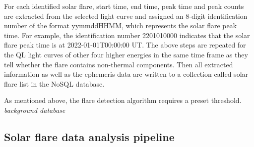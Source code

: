 \documentclass[referee]{aa} %
\begin{document}
For each identified solar flare,  start time, end time, peak time and peak 
counts are extracted from the selected light curve and assigned 
an 8-digit identification number of the format yymmddHHMM, which represents the solar flare peak time. 
For example, the identification number 2201010000  indicates that 
the solar flare peak time is at 2022-01-01T00:00:00 UT. 
The above steps are repeated  for the QL light curves of other four higher energies in the same time frame as they tell whether the flare 
contains non-thermal components. 
Then all extracted information as well as the ephemeris data are 
written to a collection called solar flare list in the NoSQL database. 

As mentioned above, the flare detection algorithm requires a preset threshold. 
{\it background database }
\subsection{Solar flare data analysis pipeline}
\end{document}

